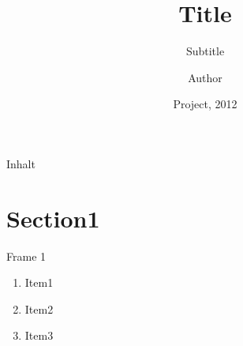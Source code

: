 \documentclass[ucs,9pt]{beamer}
\title[] %
{Title}
\subtitle
{Subtitle}
\author[] %
{Author}
\institute[FU Berlin] %
{Freie Universität Berlin}
\date[2012] %
{Project, 2012}
\begin{document}
\begin{frame}[plain]
  \titlepage
\end{frame}

\begin{frame}{Inhalt}
  \tableofcontents
\end{frame}

\section{Section1}
\begin{frame}{Frame 1}
	\begin{enumerate}
		\item Item1
		\item Item2
		\item Item3
	\end{enumerate} 
\end{frame}
\end{document}
